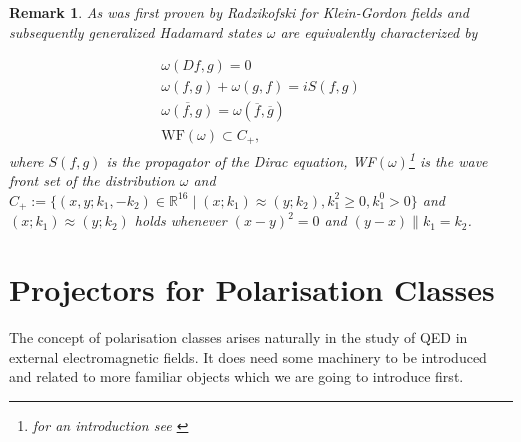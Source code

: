 \documentclass[a4paper,11pt]{article}
\newtheorem{rmk}{Remark}
\begin{document}
\begin{rmk}\label{WavefrontRemark}
As was first proven by Radzikofski\cite{(basically copy Zahn)} for Klein-Gordon fields and subsequently generalized \cite{something} 
Hadamard states \(\omega\) are equivalently characterized by

\begin{align}
\omega(Df,g)=0\\
\omega(f,g)+\omega(g,f)=i S(f,g)\\
\overline{\omega(f,g)}=\omega(\overline{f},\overline{g})\\
\text{WF}(\omega)\subset C_+,
\end{align}
where \(S(f,g)\) is the propagator of the Dirac equation, WF\((\omega)\)\footnote{for an introduction see \cite{friendly introduction, maybe also bär book}}
 is the wave front set of the distribution \(\omega\)
 and  \(C_+:=\{(x,y;k_1,-k_2)\in\mathbb{R}^{16}\mid (x;k_1)\approx (y;k_2) , k_1^2\ge0, k_1^0>0\}\)
and \((x;k_1)\approx(y;k_2)\) holds whenever \((x-y)^2=0\) and \((y-x)\parallel k_1 = k_2\).
\end{rmk}






\section{Projectors for Polarisation Classes}\label{sec:pol classes}

The concept of polarisation classes arises naturally in the study of QED in external electromagnetic fields. It does need some
machinery to be introduced and related to more familiar objects which we are going to introduce first. 
\end{document}
